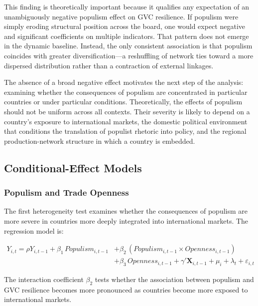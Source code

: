 \documentclass[12pt]{article}
\begin{document}
This finding is theoretically important because it qualifies any expectation of an unambiguously negative populism effect on GVC resilience. If populism were simply eroding structural position across the board, one would expect negative and significant coefficients on multiple indicators. That pattern does not emerge in the dynamic baseline. Instead, the only consistent association is that populism coincides with greater diversification---a reshuffling of network ties toward a more dispersed distribution rather than a contraction of external linkages.

The absence of a broad negative effect motivates the next step of the analysis: examining whether the consequences of populism are concentrated in particular countries or under particular conditions. Theoretically, the effects of populism should not be uniform across all contexts. Their severity is likely to depend on a country's exposure to international markets, the domestic political environment that conditions the translation of populist rhetoric into policy, and the regional production-network structure in which a country is embedded.



\subsection{Conditional-Effect Models}

\subsubsection*{Populism and Trade Openness}

The first heterogeneity test examines whether the consequences of populism are more severe in countries more deeply integrated into international markets. The regression model is:

\begin{equation}
\label{eq:openness}
\begin{split}
Y_{i,t} = \rho Y_{i,t-1} + \beta_1 \, Populism_{i,t-1}
  &+ \beta_2 \, (Populism_{i,t-1} \times Openness_{i,t-1}) \\
  &+ \beta_3 \, Openness_{i,t-1} + \gamma' \mathbf{X}_{i,t-1} + \mu_i + \lambda_t + \varepsilon_{i,t}
\end{split}
\end{equation}

The interaction coefficient $\beta_2$ tests whether the association between populism and GVC resilience becomes more pronounced as countries become more exposed to international markets.
\end{document}
